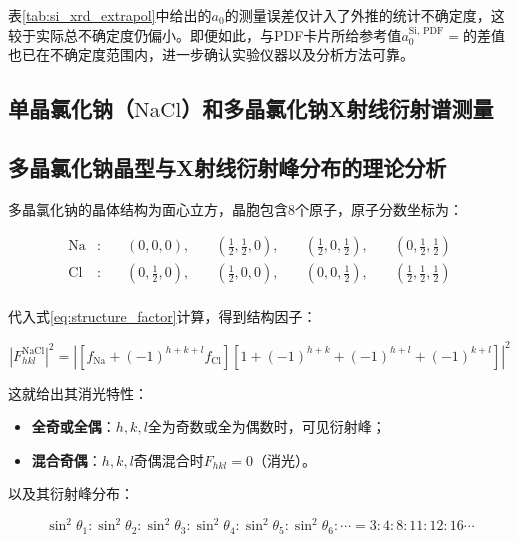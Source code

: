 \documentclass{thuemp}
\begin{document}
表\ref{tab:si_xrd_extrapol}中给出的$a_0$的测量误差仅计入了外推的统计不确定度，这较于实际总不确定度仍偏小。即便如此，与PDF卡片所给参考值$a_0^{\text{Si, PDF}} = $的差值也已在不确定度范围内，进一步确认实验仪器以及分析方法可靠。

\subsection{单晶氯化钠（$\text{NaCl}$）和多晶氯化钠X射线衍射谱测量}

\subsection{多晶氯化钠晶型与X射线衍射峰分布的理论分析}

多晶氯化钠的晶体结构为面心立方，晶胞包含8个原子，原子分数坐标为：

\begin{align*}
\text{Na} &:
\quad &\left(0,0,0\right),
\quad &\left(\frac{1}{2},\frac{1}{2},0\right),
\quad &\left(\frac{1}{2},0,\frac{1}{2}\right),
\quad &\left(0,\frac{1}{2},\frac{1}{2}\right)\\
\text{Cl} &:
\quad &\left(0,\frac{1}{2},0\right),
\quad &\left(\frac{1}{2},0,0\right),
\quad &\left(0,0,\frac{1}{2}\right),
\quad &\left(\frac{1}{2},\frac{1}{2}, \frac{1}{2}\right) \\
\end{align*}

代入式\ref{eq:structure_factor}计算，得到结构因子：

\begin{equation}
    |F_{hkl}^{\text{NaCl}}|^2 = |\left[f_{\text{Na}}+(-1)^{h+k+l}f_\text{Cl}\right]\left[ 1 + (-1)^{h+k} + (-1)^{h+l} + (-1)^{k+l}\right]|^2
\end{equation}

这就给出其消光特性：

\begin{itemize}
    \item \textbf{全奇或全偶}：$h,k,l$全为奇数或全为偶数时，可见衍射峰；
    \item \textbf{混合奇偶}：$h,k,l$奇偶混合时$F_{hkl}=0$（消光）。
\end{itemize}

以及其衍射峰分布：

\begin{equation}
    \sin^2\theta_1 : \sin^2\theta_2: \sin^2\theta_3 : \sin^2\theta_4 : \sin^2\theta_5 : \sin^2\theta_6 : \cdots =
    3 : 4 : 8 : 11 : 12: 16 \cdots
    \label{eq:nacl_diff_patt}
\end{equation}
\end{document}
